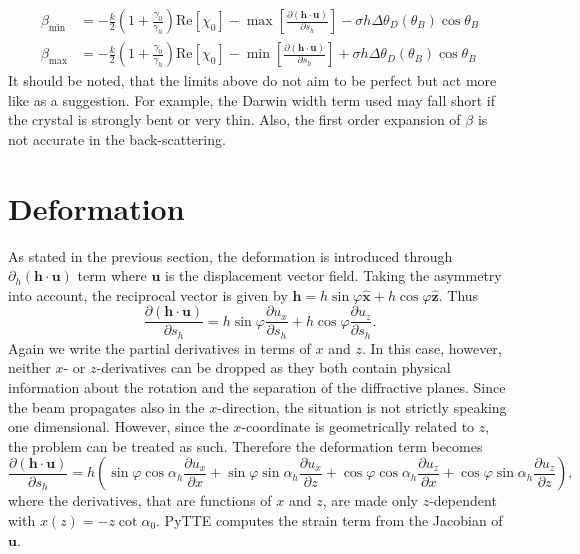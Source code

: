 \documentclass[11pt,a4paper]{article}
\begin{document}
\begin{align}
\beta_{\mathrm{min}} &= - \frac{k}{2} \left( 1 + \frac{\gamma_0}{\gamma_h} \right) \mathrm{Re}[\chi_0] - \max \left[ \frac{\partial (\mathbf{h}\cdot\mathbf{u}) }{\partial s_h} \right] - \sigma h \Delta \theta_D (\theta_B) \cos \theta_B \\
\beta_{\mathrm{max}} &= -\frac{k}{2} \left( 1 + \frac{\gamma_0}{\gamma_h} \right) \mathrm{Re}[\chi_0] - \min \left[  \frac{\partial (\mathbf{h}\cdot\mathbf{u}) }{\partial s_h} \right] +  \sigma h \Delta \theta_D (\theta_B) \cos \theta_B
\end{align}
It should be noted, that the limits above do not aim to be perfect but act more like as a suggestion. For example, the Darwin width term used may fall short if the crystal is strongly bent or very thin. Also, the first order expansion of $\beta$ is not accurate in the back-scattering.

\section{Deformation}
As stated in the previous section, the deformation is introduced through $\partial_h(\mathbf{h}\cdot \mathbf{u})$ term where $\mathbf{u}$ is the displacement vector field. Taking the asymmetry into account, the reciprocal vector is given by $\mathbf{h} = h \sin \varphi \hat{\mathbf{x}} + h \cos \varphi \hat{\mathbf{z}}$. Thus
\begin{equation}
\frac{\partial (\mathbf{h}\cdot \mathbf{u})}{\partial s_h} = h \sin \varphi \frac{\partial u_x}{\partial s_h} + h \cos \varphi \frac{\partial u_z}{\partial s_h}.
\end{equation}
Again we write the partial derivatives in terms of $x$ and $z$. In this case, however, neither $x$- or $z$-derivatives can be dropped as they both contain physical information about the rotation and the separation of the diffractive planes. Since the beam propagates also in the $x$-direction, the situation is not strictly speaking one dimensional. However, since the $x$-coordinate is geometrically related to $z$, the problem can be treated as such. Therefore the deformation term becomes
\begin{equation}
\frac{\partial (\mathbf{h}\cdot \mathbf{u})}{\partial s_h} = h \left( 
\sin \varphi \cos \alpha_h \frac{\partial u_x}{\partial x} 
+\sin \varphi \sin \alpha_h \frac{\partial u_x}{\partial z} 
+\cos \varphi \cos \alpha_h \frac{\partial u_z}{\partial x} 
+\cos \varphi \sin \alpha_h \frac{\partial u_z}{\partial z} 
 \right),
\end{equation}
where the derivatives, that are functions of $x$ and $z$, are made only $z$-dependent with $x(z)=-z \cot \alpha_0$. PyTTE computes the strain term from the Jacobian of $\mathbf{u}$.
\end{document}
